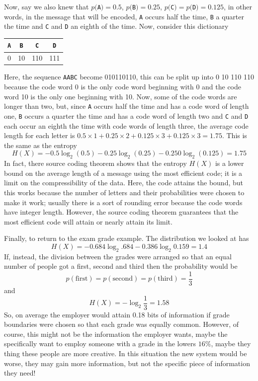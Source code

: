 \documentclass[12pt]{article}
\begin{document}
Now, say we also knew that $p($\texttt{A}$)=0.5$, $p($\texttt{B}$)=0.25$,
$p($\texttt{C}$)=p($\texttt{D}$)=0.125$, in other words, in the message that will be
encoded, \texttt{A} occurs half the time, \texttt{B} a quarter the time and \texttt{C} and \texttt{D} an
eighth of the time. Now, consider this dictionary
\begin{center}
\begin{tabular}{cccc}
\texttt{A}&\texttt{B}&\texttt{C}&\texttt{D}\\
\hline
0&10&110&111
\end{tabular}
\end{center}
Here, the sequence \texttt{AABC} become 010110110, this can be split up into 0
10 110 110 because the code word 0 is the only code word beginning
with 0 and the code word 10 is the only one beginning with 10. Now,
some of the code words are longer than two, but, since \texttt{A} occurs half
the time and has a code word of length one, \texttt{B} occurs a quarter the
time and has a code word of length two and \texttt{C} and \texttt{D} each occur an
eighth the time with code words of length three, the average code
length for each letter is $0.5\times 1 +0.25\times 2 + 0.125\times 3 +
0.125\times 3=1.75$. This is the same as the entropy
\begin{equation}
H(X)=-0.5\log_2(0.5)-0.25\log_2(0.25)-0.250\log_2(0.125)=1.75
\end{equation}
In fact, there source coding theorem shows that the entropy $H(X)$ is
a lower bound on the average length of a message using the most
efficient code; it is a limit on the compressibility of the
data. Here, the code attains the bound, but this works because the
number of letters and their probabilities were chosen to make it work;
usually there is a sort of rounding error because the code words have
integer length. However, the source coding theorem guarantees that the
most efficient code will attain or nearly attain its limit.

Finally, to return to the exam grade example. The distribution we looked at has
\begin{equation}
H(X)=-0.684\log_2{.684}-0.386\log_2{0.159}=1.4
\end{equation}
If, instead, the division between the grades were arranged so that an equal number of people got a first, second and third then the probability would be 
\begin{equation}
p(\mbox{first})=p(\mbox{second})=p(\mbox{third})=\frac{1}{3}
\end{equation}
and
\begin{equation}
H(X)=-\log_2\frac{1}{3}=1.58
\end{equation}
So, on average the employer would attain 0.18 bits of information if
grade boundaries were chosen so that each grade was equally
common. However, of course, this might not be the information the
employer wants, maybe the specifically want to employ someone with a
grade in the lowers $16\%$, maybe they thing these people are more
creative. In this situation the new system would be worse, they may
gain more information, but not the specific piece of information they
need!
\end{document}
